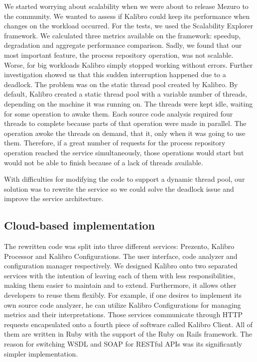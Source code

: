 We started worrying about scalability when we were about to release Mezuro to the community. We wanted to assess if Kalibro could keep its performance when changes on the workload occurred. For the tests, we used the Scalability Explorer\cite{moura2013automated} framework. We calculated three metrics available on the framework: speedup, degradation and aggregate performance comparison\cite{li2012catalogue}. Sadly, we found that our most important feature, the process repository operation, was not scalable. Worse, for big workloads Kalibro simply stopped working without errors. Further investigation showed us that this sudden interruption happened due to a deadlock. The problem was on the static thread pool created by Kalibro. By default, Kalibro created a static thread pool with a variable number of threads, depending on the machine it was running on. The threads were kept idle, waiting for some operation to awake them. Each source code analysis required four threads to complete because parts of that operation were made in parallel. The operation awoke the threads on demand, that it, only when it was going to use them. Therefore, if a great number of requests for the process repository operation reached the service simultaneously, those operations would start but would not be able to finish because of a lack of threads available.

With difficulties for modifying the code to support a dynamic thread pool, our solution was to rewrite the service so we could solve the deadlock issue and improve the service architecture.

\subsection{Cloud-based implementation}
\label{subsec:cloud-based-implementation}

The rewritten code was split into three different services: Prezento, Kalibro Processor and Kalibro Configurations. The user interface, code analyzer and configuration manager respectively. We designed Kalibro onto two separated services with the intention of leaving each of them with less responsibilities, making them easier to maintain and to extend. Furthermore, it allows other developers to reuse them flexibly. For example, if one desires to implement its own source code analyzer, he can utilize Kalibro Configurations for managing metrics and their interpretations. Those services communicate through HTTP requests encapsulated onto a fourth piece of software called Kalibro Client. All of them are written in Ruby with the support of the Ruby on Rails framework. The reason for switching WSDL and SOAP for RESTful APIs was its significantly simpler implementation.


